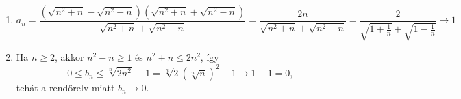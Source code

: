 \documentclass[11pt]{scrartcl}
\begin{document}
\begin{enumerate}
	\item \[
		      a_n
		      = \frac{
			      \left( \sqrt{n^2 + n} - \sqrt{n^2 - n} \right)
			      \left( \sqrt{n^2 + n} + \sqrt{n^2 - n} \right)
		      }{
			      \sqrt{n^2 + n} + \sqrt{n^2 - n}
		      }
		      = \frac{2n}{\sqrt{n^2 + n} + \sqrt{n^2 - n}}
		      = \frac{2}{\sqrt{1 + \frac{1}{n}} + \sqrt{1 - \frac{1}{n}}}
		      \to 1
	      \]

	\item Ha $n \ge 2$, akkor $n^2 - n \ge 1$ és $n^2 + n \le 2n^2$, így
	      \[
		      0
		      \le b_n
		      \le \sqrt[n]{2n^2} - 1
		      = \sqrt[n]{2} \left( \sqrt[n]{n} \right)^2 - 1
		      \to 1 - 1 = 0,
	      \]
	      tehát a rendőrelv miatt $b_n \to 0$.
\end{enumerate}
\end{document}
